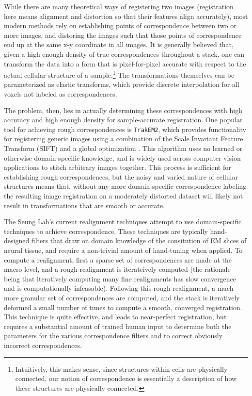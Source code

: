 While there are many theoretical ways of registering two images (registration here means alignment and distortion so that their features align accurately), most modern methods rely on establishing points of correspondence between two or more images, and distoring the images such that those points of correspondence end up at the same x-y coordinate in all images. It is generally believed that, given a high enough density of true correspondences throughout a stack, one can transform the data into a form that is pixel-for-pixel accurate with respect to the actual cellular structure of a sample.\footnote{Intuitively, this makes sense, since structures within cells are physically connected, our notion of correspondence is essentially a description of how these structures are physically connected.} The transformations themselves can be parameterized as elastic transforms, which provide discrete interpolation for all voxels not labeled as correspondences.

The problem, then, lies in actually determining these correspondences with high accuracy and high enough density for sample-accurate registration. One popular tool for achieving rough correspondences is \texttt{TrakEM2}, which provides functionality for registering generic images using a combination of the Scale Invariant Feature Transform (SIFT) and a global optimization \cite{Lowe1999}. This algorithm uses no learned or otherwise domain-specific knowledge, and is widely used across computer vision applications to stitch arbitrary images together. This process is sufficient for establishing rough correspondences, but the noisy and varied nature of cellular structures means that, without any more domain-specific correspondence labeling the resulting image registration on a moderately distorted dataset will likely not result in transformations that are smooth or accurate.

The Seung Lab's current realignment techniques attempt to use domain-specific techniques to achieve correspondence. These techniques are typically hand-designed filters that draw on domain knowledge of the consitution of EM slices of neural tissue, and require a non-trivial amount of hand-tuning when applied. To compute a realignment, first a sparse set of correspondences are made at the macro level, and a rough realignment is iterateively computed (the rationale being that iteratively computing many fine realignments has slow convergence and is computationally infeasable). Following this rough realignment, a much more granular set of correspondences are computed, and the stack is iteratively deformed a small number of times to compute a smooth, converged registration. This technique is quite effective, and leads to near-perfect registration, but requires a substantial amount of trained human input to determine both the parameters for the various correspondence filters and to correct obviously incorrect correspondences.

